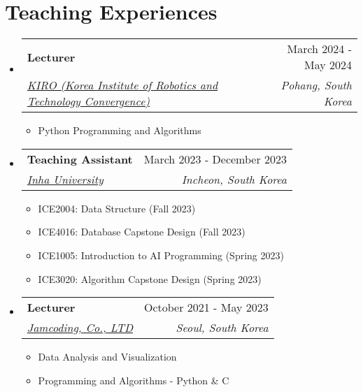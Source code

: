 \documentclass[letterpaper,11pt]{article}
\makeatletter
\newcommand{\resumeSubheading}[4]{
  \vspace{-1pt}\item
    \begin{tabular*}{0.97\textwidth}{l@{\extracolsep{\fill}}r}
      #1 & #2 \\
      \textit{\small#3} & \textit{\small #4} \\
    \end{tabular*}\vspace{-5pt}
}
\makeatother
\begin{document}
    \section{Teaching Experiences}
    \begin{itemize}[leftmargin=*,label=]

        \resumeSubheading
        {\textbf{Lecturer}}{March 2024 - May 2024}
            {\href{https://www.kiro.re.kr/eng/default.asp}{KIRO (Korea Institute of Robotics and Technology Convergence)}}{Pohang, South Korea}
            \begin{itemize}[label=\bullet]
                \item{Python Programming and Algorithms}
            \end{itemize}
            
        \resumeSubheading
        {\textbf{Teaching Assistant}}{March 2023 - December 2023}
            {\href{https://eng.inha.ac.kr/eng/index.do}{Inha University}}{Incheon, South Korea}
            \begin{itemize}[label=\bullet]
                \item{ICE2004: Data Structure (Fall 2023)}
                \item{ICE4016: Database Capstone Design (Fall 2023)}
                \item{ICE1005: Introduction to AI Programming (Spring 2023)}
                \item{ICE3020: Algorithm Capstone Design (Spring 2023)}
            \end{itemize}

        \resumeSubheading
        {\textbf{Lecturer}}{October 2021 - May 2023}
            {\href{https://jamcoding.co.kr/}{Jamcoding, Co., LTD}}{Seoul, South Korea}
            \begin{itemize}[label=\bullet]
                \item{Data Analysis and Visualization}
                \item{Programming and Algorithms - Python \& C}
            \end{itemize}
            
    \end{itemize}
    
\end{document}
